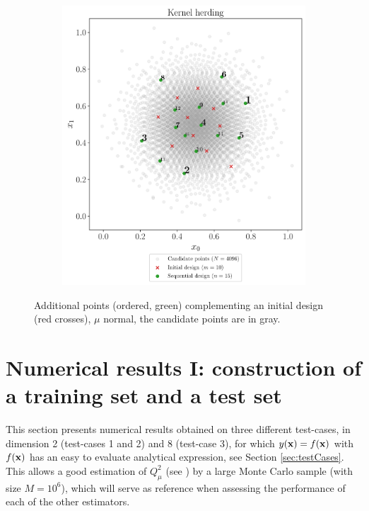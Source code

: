 \begin{figure}
\begin{subfigure}[b]{0.48\linewidth}
  \end{subfigure}
  \\
  \begin{subfigure}[b]{0.48\linewidth}
    \centering
    \includegraphics[width=\textwidth]{./part2/figures/SIS/normal2D_KH.pdf}
  \end{subfigure}
  \caption{Additional points (ordered, green) complementing an initial design (red crosses), $\mu$ normal, the candidate points are in gray. \\
  }
  \label{fig:normal_validation_designs}
\end{figure}   





\section{Numerical results I: construction of a training set and a test set}\label{sec:val_res1}
This section presents numerical results obtained on three different test-cases, in dimension 2 (test-cases 1 and 2) and 8 (test-case 3), for which $y({\bf x})=f({\bf x})$ with $f({\bf x})$ has an easy to evaluate analytical expression, see Section \ref{sec:testCases}. 
This allows a good estimation of $Q_\mu^2$ (see ) by a large Monte Carlo sample (with size $M=10^6$), which will serve as reference when assessing the performance of each of the other estimators. 

